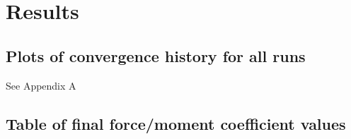 \section{Results}


\subsection{Plots of convergence history for all runs}
See Appendix A

\subsection{Table of final force/moment coefficient values}

